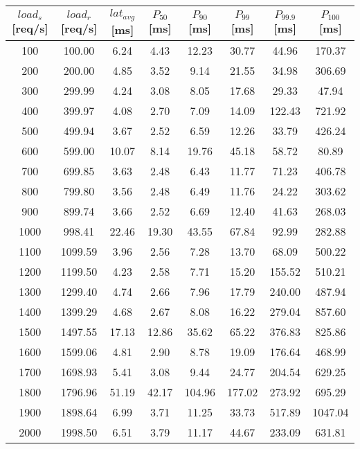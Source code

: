 \begin{table}[!h]
	\begin{adjustwidth}{-2cm}{-2cm}
		\begin{tabular}{|c|c|c|c|c|c|c|c|}
			\hline
			 $load_{s}$ [req/s] & $load_{r}$ [req/s] & $lat_{avg}$ [ms] & $P_{50}$ [ms] & $P_{90}$ [ms] & $P_{99}$ [ms] & $P_{99.9}$ [ms] & $P_{100}$ [ms] \\
			\hline
			100 & 100.00 & 6.24 & 4.43 & 12.23 & 30.77 & 44.96 & 170.37 \\ \hline
			200 & 200.00 & 4.85 & 3.52 & 9.14 & 21.55 & 34.98 & 306.69 \\ \hline
			300 & 299.99 & 4.24 & 3.08 & 8.05 & 17.68 & 29.33 & 47.94 \\ \hline
			400 & 399.97 & 4.08 & 2.70 & 7.09 & 14.09 & 122.43 & 721.92 \\ \hline
			500 & 499.94 & 3.67 & 2.52 & 6.59 & 12.26 & 33.79 & 426.24 \\ \hline
			600 & 599.00 & 10.07 & 8.14 & 19.76 & 45.18 & 58.72 & 80.89 \\ \hline
			700 & 699.85 & 3.63 & 2.48 & 6.43 & 11.77 & 71.23 & 406.78 \\ \hline
			800 & 799.80 & 3.56 & 2.48 & 6.49 & 11.76 & 24.22 & 303.62 \\ \hline
			900 & 899.74 & 3.66 & 2.52 & 6.69 & 12.40 & 41.63 & 268.03 \\ \hline
			1000 & 998.41 & 22.46 & 19.30 & 43.55 & 67.84 & 92.99 & 282.88 \\ \hline
			1100 & 1099.59 & 3.96 & 2.56 & 7.28 & 13.70 & 68.09 & 500.22 \\ \hline
			1200 & 1199.50 & 4.23 & 2.58 & 7.71 & 15.20 & 155.52 & 510.21 \\ \hline
			1300 & 1299.40 & 4.74 & 2.66 & 7.96 & 17.79 & 240.00 & 487.94 \\ \hline
			1400 & 1399.29 & 4.68 & 2.67 & 8.08 & 16.22 & 279.04 & 857.60 \\ \hline
			1500 & 1497.55 & 17.13 & 12.86 & 35.62 & 65.22 & 376.83 & 825.86 \\ \hline
			1600 & 1599.06 & 4.81 & 2.90 & 8.78 & 19.09 & 176.64 & 468.99 \\ \hline
			1700 & 1698.93 & 5.41 & 3.08 & 9.44 & 24.77 & 204.54 & 629.25 \\ \hline
			1800 & 1796.96 & 51.19 & 42.17 & 104.96 & 177.02 & 273.92 & 695.29 \\ \hline
			1900 & 1898.64 & 6.99 & 3.71 & 11.25 & 33.73 & 517.89 & 1047.04 \\ \hline
			2000 & 1998.50 & 6.51 & 3.79 & 11.17 & 44.67 & 233.09 & 631.81 \\ \hline

\end{tabular}
\end{adjustwidth}
\end{table}
